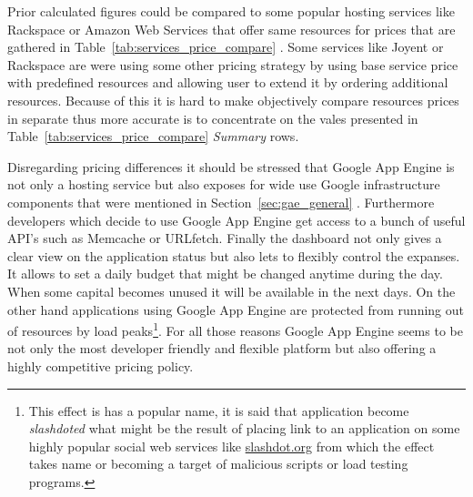 Prior calculated figures could be compared to some popular hosting services like Rackspace or Amazon Web Services that offer same resources for prices that are gathered in Table~\ref{tab:services_price_compare} . 
Some services like Joyent or Rackspace are were using some other pricing strategy by using base service price with predefined resources and allowing user to extend it by ordering additional resources. Because of this it is hard to make objectively compare resources prices in separate thus more accurate is to concentrate on the vales presented in Table~\ref{tab:services_price_compare} \emph{Summary} rows.    

Disregarding pricing differences it should be stressed that Google App Engine is not only a hosting service but also exposes for wide use Google infrastructure components that were mentioned in Section~\ref{sec:gae_general} . Furthermore developers which decide to use Google App Engine get access to a bunch of useful API's such as Memcache or URLfetch. Finally the dashboard not only gives a clear view on the application status but also lets to flexibly control the expanses. It allows to set a daily budget that might be changed anytime during the day. When some capital becomes unused it will be available in the next days. On the other hand applications using Google App Engine are protected  from running out of resources by load peaks\footnote{This effect is has a popular name, it is said that application become \emph{slashdoted} what might be the result of placing link to an application on some highly popular social web services like \url{slashdot.org} from which the effect takes name or becoming a target of malicious scripts or load testing programs.}. For all those reasons Google App Engine seems to be not only the most developer friendly and flexible platform but also offering a highly competitive pricing policy.   

